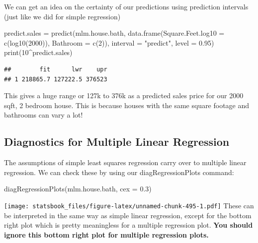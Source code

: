 \documentclass[
]{book}
\newenvironment{Shaded}{\begin{snugshade}}{\end{snugshade}}
\newcommand{\AttributeTok}[1]{\textcolor[rgb]{0.77,0.63,0.00}{#1}}
\newcommand{\DecValTok}[1]{\textcolor[rgb]{0.00,0.00,0.81}{#1}}
\newcommand{\FloatTok}[1]{\textcolor[rgb]{0.00,0.00,0.81}{#1}}
\newcommand{\FunctionTok}[1]{\textcolor[rgb]{0.00,0.00,0.00}{#1}}
\newcommand{\NormalTok}[1]{#1}
\newcommand{\OtherTok}[1]{\textcolor[rgb]{0.56,0.35,0.01}{#1}}
\newcommand{\SpecialCharTok}[1]{\textcolor[rgb]{0.00,0.00,0.00}{#1}}
\newcommand{\StringTok}[1]{\textcolor[rgb]{0.31,0.60,0.02}{#1}}
\theoremstyle{definition}
\theoremstyle{definition}
\theoremstyle{definition}
\theoremstyle{definition}
\theoremstyle{remark}
\begin{document}
We can get an idea on the certainty of our predictions using prediction intervals (just like we did for simple regression)

\begin{Shaded}
\begin{Highlighting}[]
\NormalTok{predict.sales }\OtherTok{=} \FunctionTok{predict}\NormalTok{(mlm.house.bath, }\FunctionTok{data.frame}\NormalTok{(}\AttributeTok{Square.Feet.log10 =} \FunctionTok{c}\NormalTok{(}\FunctionTok{log10}\NormalTok{(}\DecValTok{2000}\NormalTok{)),}
    \AttributeTok{Bathroom =} \FunctionTok{c}\NormalTok{(}\DecValTok{2}\NormalTok{)), }\AttributeTok{interval =} \StringTok{"predict"}\NormalTok{, }\AttributeTok{level =} \FloatTok{0.95}\NormalTok{)}
\FunctionTok{print}\NormalTok{(}\DecValTok{10}\SpecialCharTok{\^{}}\NormalTok{predict.sales)}
\end{Highlighting}
\end{Shaded}

\begin{verbatim}
##        fit      lwr    upr
## 1 218865.7 127222.5 376523
\end{verbatim}

This gives a huge range or 127k to 376k as a predicted sales price for our 2000 sqft, 2 bedroom house. This is because houses with the same square footage and bathrooms can vary a lot!

\hypertarget{diagnostics-for-multiple-linear-regression}{%
\subsection{Diagnostics for Multiple Linear Regression}\label{diagnostics-for-multiple-linear-regression}}

The assumptions of simple least squares regression carry over to multiple linear regression. We can check these by using our diagRegressionPlots command:

\begin{Shaded}
\begin{Highlighting}[]
\FunctionTok{diagRegressionPlots}\NormalTok{(mlm.house.bath, }\AttributeTok{cex =} \FloatTok{0.3}\NormalTok{)}
\end{Highlighting}
\end{Shaded}

\texttt{[image: statsbook\_files/figure-latex/unnamed-chunk-495-1.pdf]}
These can be interpreted in the same way as simple linear regression, except for the bottom right plot which is pretty meaningless for a multiple regression plot. \textbf{You should ignore this bottom right plot for multiple regression plots.}
\end{document}
